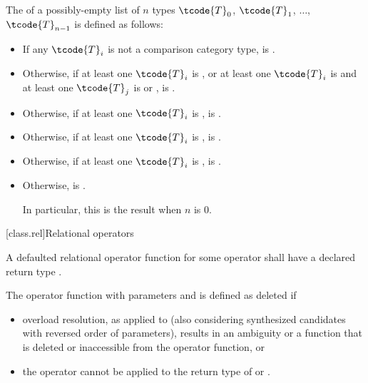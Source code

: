 \pnum
The  
of a possibly-empty list of $n$ types
$\tcode{T}_0$, $\tcode{T}_1$, $\dotsc$, $\tcode{T}_{n-1}$
is defined as follows:

\begin{itemize}
\item
If any $\tcode{T}_i$
is not a comparison category type,
 is .

\item
Otherwise, if
at least one $\tcode{T}_i$ is , or
at least one $\tcode{T}_i$ is  and
at least one $\tcode{T}_j$ is  or
                              ,
 is .

\item
Otherwise, if at least one $\tcode{T}_i$ is ,
 is .

\item
Otherwise, if at least one $\tcode{T}_i$ is ,
 is .

\item
Otherwise, if at least one $\tcode{T}_i$ is ,
 is .

\item
Otherwise,  is .
\begin{note}
In particular, this is the result when $n$ is 0.
\end{note}
\end{itemize}

[class.rel]{Relational operators}
%

\pnum
A defaulted relational operator function
for some operator 
shall have a declared return type .

\pnum
The operator function with parameters  and 
is defined as deleted if

\begin{itemize}
\item
overload resolution,
as applied to 
(also considering synthesized candidates with reversed order of parameters),
results in an ambiguity
or a function that is deleted or inaccessible from the operator function,
or

\item
the operator 
cannot be applied to the return type of  or .
\end{itemize}

